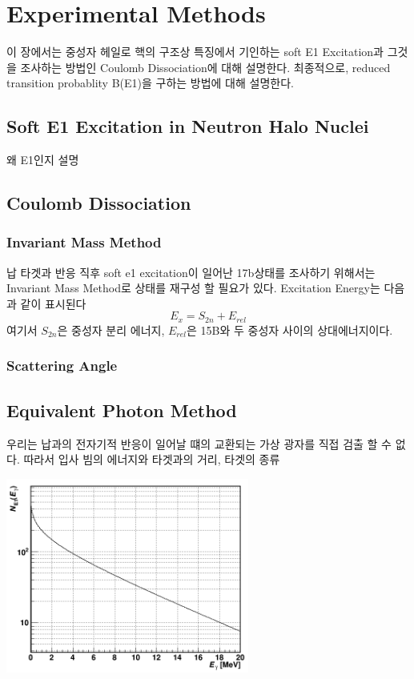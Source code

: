 \chapter{Experimental Methods}
이 장에서는 중성자 헤일로 핵의 구조상 특징에서 기인하는 soft E1 Excitation과 그것을 조사하는 방법인 Coulomb Dissociation에 대해 설명한다. 최종적으로, reduced transition probablity B(E1)을 구하는 방법에 대해 설명한다.

\section{Soft E1 Excitation in Neutron Halo Nuclei}
왜 E1인지 설명
\section{Coulomb Dissociation}

\subsection{Invariant Mass Method}
납 타겟과 반응 직후 soft e1 excitation이 일어난 17b상태를 조사하기 위해서는 Invariant Mass Method로 상태를 재구성 할 필요가 있다. Excitation Energy는 다음과 같이 표시된다
\begin{displaymath}
{E}_{x}={S}_{2n}+{E}_{rel}
\end{displaymath}
여기서 ${S}_{2n}$은 중성자 분리 에너지, ${E}_{rel}$은 15B와 두 중성자 사이의 상대에너지이다. 
\subsection{Scattering Angle}

\section{Equivalent Photon Method}
우리는 납과의 전자기적 반응이 일어날 떄의 교환되는 가상 광자를 직접 검출 할 수 없다. 따라서 입사 빔의 에너지와 타겟과의 거리, 타겟의 종류
\begin{center}
\includegraphics[width=8cm]{Figure/chapter2/virtual_photon_distribution.png}    
\end{center}
